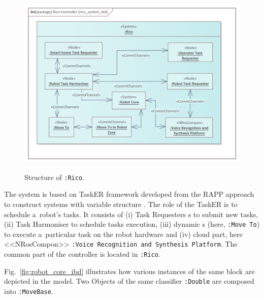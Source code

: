 \documentclass[11pt,oneside,a4paper]{report}
\begin{document}
	\begin{figure}[H]
		\centering
		\begin{center}
			{\includegraphics[scale=0.85]{img/rico_pkg/rico_system_ibd.png}}
		\end{center}
		\caption{Structure of \stSystem{}\texttt{:Rico}.} 
		\label{fig:rico_system_ibd}
	\end{figure}

	The system is based on TaskER framework \cite{tasker2020} developed from the RAPP approach to construct systems with variable structure \cite{zielinski2017variable}. The role of the TaskER is to schedule a~robot’s tasks. It consists of (i) Task Requesters \stNode{}s to submit new tasks, (ii) Task Harmoniser \stNode{} to schedule tasks execution, (iii) dynamic \stNode{}s (here, \stNode{} \texttt{:Move To}) to execute a~particular task on the robot hardware and (iv) cloud part, here <<NRosCompon>> \texttt{:Voice Recognition and Synthesis Platform}. The common part of the controller is located in \stSystem{} \texttt{:Rico}.
	
	Fig.~\ref{fig:robot_core_ibd} illustrates how various instances of the same block are depicted in the model. Two \stParameter{} Objects of the same classifier \texttt{:Double} are composed into \stNode{} \texttt{:MoveBase}.
	
\end{document}
